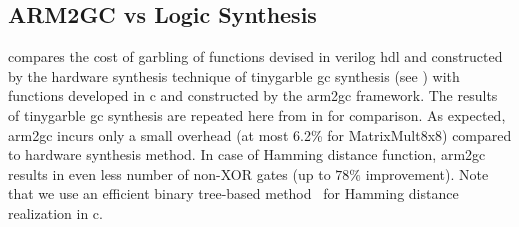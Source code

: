 \subsection{ARM2GC vs Logic Synthesis}
 compares the cost of garbling of functions devised in \gls{verilog} \acrshort{hdl} and constructed by the hardware synthesis technique of \gls{tinygarble} \acrshort{gc} synthesis (see ) with functions developed in \gls{c} and constructed by the \gls{arm2gc} framework.
The results of \gls{tinygarble} \acrshort{gc} synthesis are repeated here from  in  for comparison.
As expected, \gls{arm2gc} incurs only a small overhead (at most 6.2\% for MatrixMult8x8) compared to  hardware synthesis method.
In case of Hamming distance function, \gls{arm2gc} results in even less number of non-XOR gates (up to $78\%$ improvement).
Note that we use an efficient binary tree-based method~\cite{huang2011faster} for Hamming distance realization in \gls{c}.

